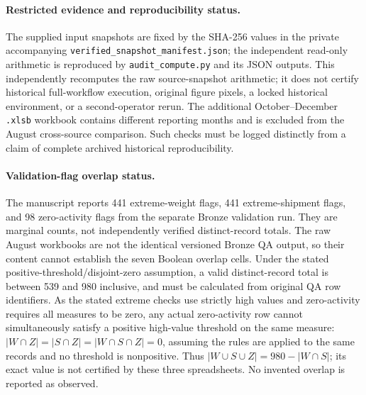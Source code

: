 \documentclass[11pt]{article}
\begin{document}
\paragraph{Restricted evidence and reproducibility status.} The supplied input snapshots are fixed by the SHA-256 values in the private accompanying \texttt{verified\_snapshot\_manifest.json}; the independent read-only arithmetic is reproduced by \texttt{audit\_compute.py} and its JSON outputs. This independently recomputes the raw source-snapshot arithmetic; it does not certify historical full-workflow execution, original figure pixels, a locked historical environment, or a second-operator rerun. The additional October--December \texttt{.xlsb} workbook contains different reporting months and is excluded from the August cross-source comparison. Such checks must be logged distinctly from a claim of complete archived historical reproducibility.

\paragraph{Validation-flag overlap status.} The manuscript reports 441 extreme-weight flags, 441 extreme-shipment flags, and 98 zero-activity flags from the separate Bronze validation run. They are marginal counts, not independently verified distinct-record totals. The raw August workbooks are not the identical versioned Bronze QA output, so their content cannot establish the seven Boolean overlap cells. Under the stated positive-threshold/disjoint-zero assumption, a valid distinct-record total is between 539 and 980 inclusive, and must be calculated from original QA row identifiers. As the stated extreme checks use strictly high values and zero-activity requires all measures to be zero, any actual zero-activity row cannot simultaneously satisfy a positive high-value threshold on the same measure: $|W\cap Z|=|S\cap Z|=|W\cap S\cap Z|=0$, assuming the rules are applied to the same records and no threshold is nonpositive. Thus $|W\cup S\cup Z|=980-|W\cap S|$; its exact value is not certified by these three spreadsheets. No invented overlap is reported as observed.
\end{document}
